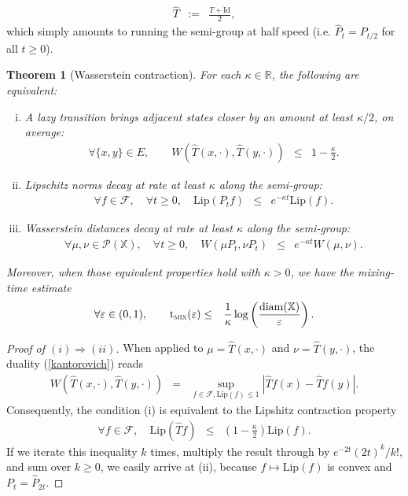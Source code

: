 \documentclass[12pt,final]{article}
\newtheorem{theorem}{Theorem}[section]
\numberwithin{equation}{section}
\newcommand{\Lip}{\mathrm {Lip}}
\newcommand{\dR}{\mathbb {R}}
\newcommand{\cF}{\mathcal {F}}
\newcommand{\dX}{\mathbb{X}}
\newcommand{\cP}{\mathcal{P}}
\newcommand{\tmix}{{\rm t}_{\textsc{mix}}}
\newcommand{\diam}{\mathrm{diam}}
\begin{document}
\begin{eqnarray}
\label{def:lazy}
\widehat{T} & := & \frac{T+\mathrm{Id}}{2},
\end{eqnarray}
which simply amounts to running the semi-group at half speed (i.e. $\widehat{P}_t=P_{t/2}$ for all $t\ge 0$). 
\begin{theorem}[Wasserstein contraction]\label{th:OR}For each $\kappa\in\dR$, the following  are equivalent:
\begin{enumerate}[(i)]
\item A lazy transition brings adjacent states closer by an amount at least $\kappa/2$,  on average:
\begin{eqnarray}
\label{OR:local}
\forall \{x,y\}\in E, \qquad W\left(\widehat{T}(x,\cdot),\widehat{T}(y,\cdot)\right) & \le & 1-\frac{\kappa}{2}.
\end{eqnarray}
\item Lipschitz norms decay at rate at least $\kappa$ along the semi-group: 
\begin{eqnarray}
\label{def:ORdual}
\forall f\in\cF,\quad \forall t\ge 0,\quad \Lip(P_tf) & \le & e^{-\kappa t}\Lip(f).
\end{eqnarray}
\item Wasserstein distances decay at rate at least $\kappa$ along the semi-group:
\begin{eqnarray}
\label{def:OR}
\forall \mu,\nu\in\cP(\dX),\quad\forall t\ge 0,\quad W(\mu P_t,\nu P_t)  & \le &  e^{-\kappa t}W(\mu,\nu).
\end{eqnarray}
\end{enumerate}
Moreover, when those equivalent properties hold with  $\kappa>0$, we have the mixing-time estimate 
\begin{eqnarray}
\label{Wmix}
\forall \varepsilon\in(0,1),\qquad \tmix(\varepsilon) & \le & \frac{1}{\kappa}\log\left( \frac{\diam(\dX)}{\varepsilon}\right).
\end{eqnarray}
\end{theorem}
\begin{proof}[Proof of $(i)\Longrightarrow(ii)$]When applied to $\mu=\widehat{T}(x,\cdot)$ and $\nu=\widehat{T}(y,\cdot)$, the duality (\ref{kantorovich}) reads
\begin{eqnarray*}
W\left(\widehat{T}(x,\cdot),\widehat{T}(y,\cdot)\right) & = & \sup_{f\in\cF,\Lip(f)\le 1} \left|\widehat{T}f(x)-\widehat{T}f(y)\right|.
\end{eqnarray*}
Consequently, the condition (i) is equivalent to the Lipshitz contraction property
\begin{eqnarray*}
\forall f\in\cF,\quad \Lip\left(\widehat{T}f\right) & \le & \left(1-\frac{\kappa}{2}\right)\Lip(f).
\end{eqnarray*}
If we iterate this inequality $k$ times, multiply the result through by $e^{-2t}{(2t)}^k/k!$, and sum over $k\ge 0$, we easily arrive at (ii), because $f\mapsto\Lip(f)$ is convex and $P_t=\widehat{P}_{2t}$. 
\end{proof}
\end{document}
